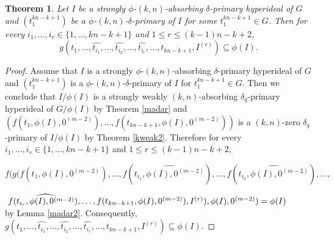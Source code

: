 \documentclass[preprint,review,10pt]{amsart}
\newtheorem{theorem}{Theorem}[section]
\theoremstyle{definition}
\theoremstyle{remark}
\numberwithin{equation}{section}
\begin{document}
\begin{theorem} \label{weak4}
 Let $I$ be a strongly $\phi$-$(k,n)$-absorbing $\delta$-primary hyperideal of $G$ and $(t_1^{kn-k+1})$ be a $\phi$-$(k,n)$-$\delta$-primary of $I$ for some $t_1^{kn-k+1} \in G$. Then  for every $i_1,\ldots,i_r \in \{1,\ldots,kn-k+1\}$ and $1 \leq r \leq (k-1)n-k+2$,
 \[g(t_1,\ldots,\widehat{t_{i_1}},\ldots,\widehat{t_{i_2}},\ldots,\widehat{t_{i_r}},\ldots,t_{kn-k+1},I^{(r)}) \subseteq \phi(I).\]
\end{theorem}
\begin{proof}
Assume that $I$ is  a strongly $\phi$-$(k,n)$-absorbing $\delta$-primary hyperideal of $G$ and $(t_1^{kn-k+1})$ is a $\phi$-$(k,n)$-$\delta$-primary of $I$ for  $t_1^{kn-k+1} \in G$. Then we conclude that $I/\phi(I)$ is a strongly weakly $(k,n)$-absorbing $\delta_q$-primary hyperideal of $G/\phi(I)$ by Theorem \ref{madar} and   $(f(t_1,\phi(I),0^{(m-2)}),\ldots,f(t_{kn-k+1},\phi(I),0^{(m-2)}))$ is a $(k,n)$-zero $\delta_q$-primary of $I/\phi(I)$ by Theorem \ref{kweak2}.  Therefore for every $i_1,\ldots,i_r \in \{1,\ldots,kn-k+1\}$ and $1 \leq r \leq (k-1)n-k+2$, 

$f(g(f(t_1,\phi(I),0^{(m-2)}),\ldots,f(\widehat{t_{i_1},\phi(I),0^{(m-2)}}),\ldots,f(\widehat{t_{i_2},\phi(I),0^{(m-2)}}),\ldots,$

$\hspace{0.1cm}f(\widehat{t_{i_r},\phi(I),0^{(m-2)}}),\ldots,
 f(t_{kn-k+1},\phi(I),0^{(m-2)}),I^{(r)}),\phi(I),0^{(m-2)})= \phi(I)$\\
 by Lemma \ref{madar2}. Consequently, $g(t_1,\ldots,\widehat{t_{i_1}},\ldots,\widehat{t_{i_2}},\ldots,\widehat{t_{i_r}},\ldots,t_{kn-k+1},I^{(r)}) \subseteq \phi(I).$
\end{proof}
\end{document}
